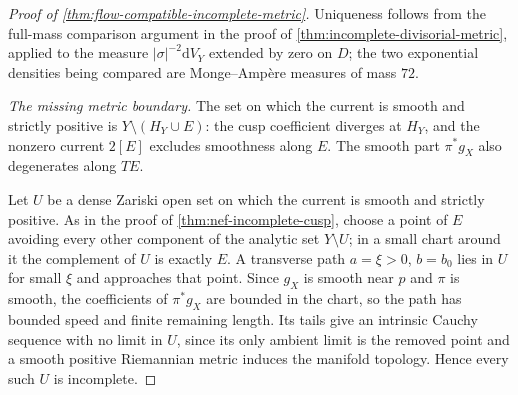 \begin{proof}[Proof of \cref{thm:flow-compatible-incomplete-metric}]
Uniqueness follows from the full-mass comparison argument in the proof of \cref{thm:incomplete-divisorial-metric}, applied to the measure $|\sigma|^{-2}\mathrm{d}V_Y$ extended by zero on $D$; the two exponential densities being compared are Monge--Amp\`ere measures of mass $72$.

\emph{The missing metric boundary.}
The set on which the current is smooth and strictly positive is $Y\setminus(H_Y\cup E)$: the cusp coefficient diverges at $H_Y$, and the nonzero current $2[E]$ excludes smoothness along $E$. The smooth part $\pi^*g_X$ also degenerates along $TE$.

Let $U$ be a dense Zariski open set on which the current is smooth and strictly positive. As in the proof of \cref{thm:nef-incomplete-cusp}, choose a point of $E$ avoiding every other component of the analytic set $Y\setminus U$; in a small chart around it the complement of $U$ is exactly $E$. A transverse path $a=\xi>0$, $b=b_0$ lies in $U$ for small $\xi$ and approaches that point. Since $g_X$ is smooth near $p$ and $\pi$ is smooth, the coefficients of $\pi^*g_X$ are bounded in the chart, so the path has bounded speed and finite remaining length. Its tails give an intrinsic Cauchy sequence with no limit in $U$, since its only ambient limit is the removed point and a smooth positive Riemannian metric induces the manifold topology. Hence every such $U$ is incomplete.
\end{proof}

